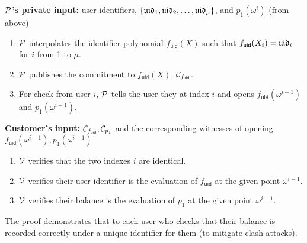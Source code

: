 

\begin{Protocol*}[t!]
\begin{mdframed}
\footnotesize


\textbf{$\mathcal{P}$'s private input:} user identifiers, $\{\mathfrak{uid}_1,\mathfrak{uid}_2,\dots,\mathfrak{uid}_\mu\}$, and $p_1(\omega^i)$ (from \pol above)
\begin{enumerate}
    \item $\mathcal{P}$ interpolates the identifier polynomial $f_\mathsf{uid}(X)$ such that $f_\mathsf{uid}(X_i)=\mathfrak{uid}_i$ for $i$ from 1 to $\mu$.
    \item $\mathcal{P}$ publishes the commitment to $f_\mathsf{uid}(X)$, $\mathcal{C}_{f_\mathsf{uid}}$.
    \item For check from user $i$, $\mathcal{P}$ tells the user they at index $i$ and opens $f_\mathsf{uid}(\omega^{i-1})$ and $p_1(\omega^{i-1})$.
\end{enumerate}

\textbf{Customer's input:} $\mathcal{C}_{f_\mathsf{uid}},\mathcal{C}_{p_1}$ and the corresponding witnesses of opening $f_\mathsf{uid}(\omega^{i-1}),p_1(\omega^{i-1})$
\begin{enumerate}
    \item $\mathcal{V}$ verifies that the two indexes $i$ are identical.
    \item $\mathcal{V}$ verifies their user identifier is the evaluation of $f_\mathsf{uid}$ at the given point $\omega^{i-1}$.
    \item $\mathcal{V}$ verifies their balance is the evaluation of $p_1$ at the given point $\omega^{i-1}$.
\end{enumerate}




\normalsize	
\end{mdframed}
\caption{The \userproof proof demonstrates that to each user who checks that their balance is recorded correctly under a unique identifier for them (to mitigate clash attacks).\label{alg:users}}
\end{Protocol*}
